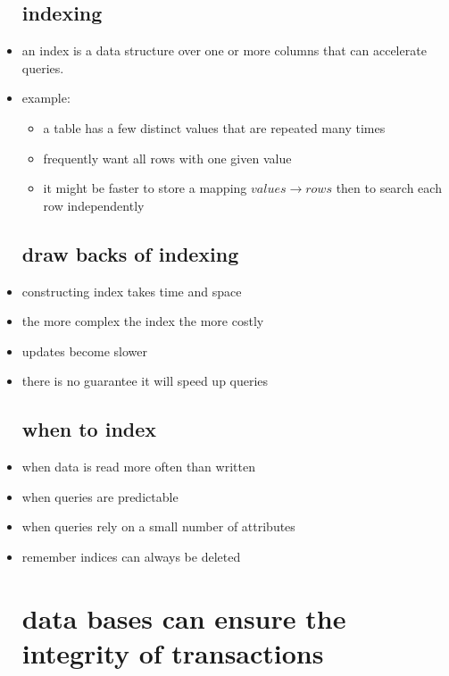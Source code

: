 \documentclass{article}
\begin{document}
\begin{itemize}
\subsection{indexing}
\item an index is a data structure over one or more columns that can accelerate queries.
\item example:
\begin{itemize}
    \item a table has a few distinct values that are repeated many times 
    \item frequently want all rows with one given value 
    \item it might be faster to store a mapping $values\rightarrow rows$ then to search each row independently
\end{itemize}
\subsection{draw backs of indexing}
\item constructing index takes time and space
\item the more complex the index the more costly
\item  updates become slower
\item there is no guarantee it will speed up queries
\subsection{when to index}
\item when data is read more often than written
\item when queries are predictable
\item when queries rely on a small number of attributes
\item remember indices can always be deleted
\section{data bases can ensure the integrity of transactions}

\end{itemize}
\end{document}
